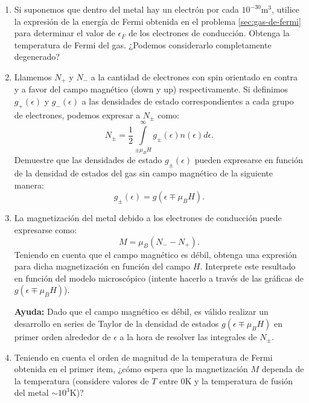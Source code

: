 \documentclass[a4paper,11pt]{article}
\begin{document}
\begin{enumerate}[label=(\alph*),
                  leftmargin=2\parindent,
                  rightmargin=2\parindent]

     \item{Si suponemos que dentro del metal hay un electrón por cada
           $10^{-30}$m$^3$, utilice la expresión de la energía de Fermi 
           obtenida en el problema \ref{sec:gas-de-fermi} para determinar el 
           valor de $\epsilon_F$ de los electrones de conducción.
           Obtenga la temperatura de Fermi del gas.
           ¿Podemos considerarlo completamente degenerado?
           }

     \item{Llamemos $N_+$ y $N_-$ a la cantidad de electrones con spin 
           orientado en contra y a favor del campo magnético (down y up) 
           respectivamente.
           Si definimos $g_+(\epsilon)$ y $g_-(\epsilon)$ a las densidades de 
           estado correspondientes a cada grupo de electrones, podemos 
           expresar a $N_\pm$ como:
           $$
           N_\pm =
           \frac{1}{2} \int\limits_{\pm \mu_B H}^{\infty}
           g_\pm(\epsilon) n(\epsilon) d\epsilon.
           $$
           Demuestre que las densidades de estado $g_\pm(\epsilon)$ pueden 
           expresarse en función de la densidad de estados del gas sin campo 
           magnético de la siguiente manera:
           $$ g_\pm(\epsilon) = g(\epsilon \mp \mu_B H). $$
           }

     \item{La magnetización del metal debido a los electrones de conducción 
           puede expresarse como:
           $$ M = \mu_B (N_- - N_+). $$
           Teniendo en cuenta que el campo magnético es débil, obtenga una 
           expresión para dicha magnetización en función del campo $H$.
           Interprete este resultado en función del modelo microscópico 
           (intente hacerlo a través de las gráficas de
           $g(\epsilon \mp \mu_B H)$).
           }

     {\small \textbf{Ayuda:} Dado que el campo magnético es débil, es válido 
     realizar un desarrollo en series de Taylor de la densidad de estados 
     $g(\epsilon \mp \mu_B H)$ en primer orden alrededor de $\epsilon$ a la 
     hora de resolver las integrales de $N_\pm$.
     }

     \item{Teniendo en cuenta el orden de magnitud de la temperatura de Fermi 
           obtenida en el primer item, ¿cómo espera que la magnetización $M$ 
           dependa de la temperatura (considere valores de $T$ entre 0K y la 
           temperatura de fusión del metal $\sim 10^3$K)?
           }

\end{enumerate}
\end{document}
